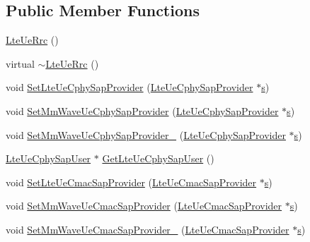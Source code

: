 \subsection*{Public Member Functions}
\begin{DoxyCompactItemize}
\item 
\hyperlink{classns3_1_1LteUeRrc_ac88049382e8f5b8c006f9787c724bb8c}{Lte\+Ue\+Rrc} ()
\item 
virtual \hyperlink{classns3_1_1LteUeRrc_a92a1f9c9e23397196fcf4ea7868f15c5}{$\sim$\+Lte\+Ue\+Rrc} ()
\item 
void \hyperlink{classns3_1_1LteUeRrc_a5203d99fcc25799adec477cf65527e73}{Set\+Lte\+Ue\+Cphy\+Sap\+Provider} (\hyperlink{classns3_1_1LteUeCphySapProvider}{Lte\+Ue\+Cphy\+Sap\+Provider} $\ast$\hyperlink{generate__test__data__lte__sinr_8m_ad83eeb3a142285d1243a08c6b7026df8}{s})
\item 
void \hyperlink{classns3_1_1LteUeRrc_ad9caa2828510f3d9e68d18471556e19b}{Set\+Mm\+Wave\+Ue\+Cphy\+Sap\+Provider} (\hyperlink{classns3_1_1LteUeCphySapProvider}{Lte\+Ue\+Cphy\+Sap\+Provider} $\ast$\hyperlink{generate__test__data__lte__sinr_8m_ad83eeb3a142285d1243a08c6b7026df8}{s})
\item 
void \hyperlink{classns3_1_1LteUeRrc_a8f86e64389ccfb5d940fd4faa4035330}{Set\+Mm\+Wave\+Ue\+Cphy\+Sap\+Provider\+\_} (\hyperlink{classns3_1_1LteUeCphySapProvider}{Lte\+Ue\+Cphy\+Sap\+Provider} $\ast$\hyperlink{generate__test__data__lte__sinr_8m_ad83eeb3a142285d1243a08c6b7026df8}{s})
\item 
\hyperlink{classns3_1_1LteUeCphySapUser}{Lte\+Ue\+Cphy\+Sap\+User} $\ast$ \hyperlink{classns3_1_1LteUeRrc_a1f0bf64a04dca62df7ab82c7d752bdac}{Get\+Lte\+Ue\+Cphy\+Sap\+User} ()
\item 
void \hyperlink{classns3_1_1LteUeRrc_a1d740b81152e192e2f811da1ce34d776}{Set\+Lte\+Ue\+Cmac\+Sap\+Provider} (\hyperlink{classns3_1_1LteUeCmacSapProvider}{Lte\+Ue\+Cmac\+Sap\+Provider} $\ast$\hyperlink{generate__test__data__lte__sinr_8m_ad83eeb3a142285d1243a08c6b7026df8}{s})
\item 
void \hyperlink{classns3_1_1LteUeRrc_ab32fd50876eb0eff496d06e48bd3908c}{Set\+Mm\+Wave\+Ue\+Cmac\+Sap\+Provider} (\hyperlink{classns3_1_1LteUeCmacSapProvider}{Lte\+Ue\+Cmac\+Sap\+Provider} $\ast$\hyperlink{generate__test__data__lte__sinr_8m_ad83eeb3a142285d1243a08c6b7026df8}{s})
\item 
void \hyperlink{classns3_1_1LteUeRrc_ad4ffd9ceb4241ee1e5a3159c0d6d1b8e}{Set\+Mm\+Wave\+Ue\+Cmac\+Sap\+Provider\+\_} (\hyperlink{classns3_1_1LteUeCmacSapProvider}{Lte\+Ue\+Cmac\+Sap\+Provider} $\ast$\hyperlink{generate__test__data__lte__sinr_8m_ad83eeb3a142285d1243a08c6b7026df8}{s})

\end{DoxyCompactItemize}
